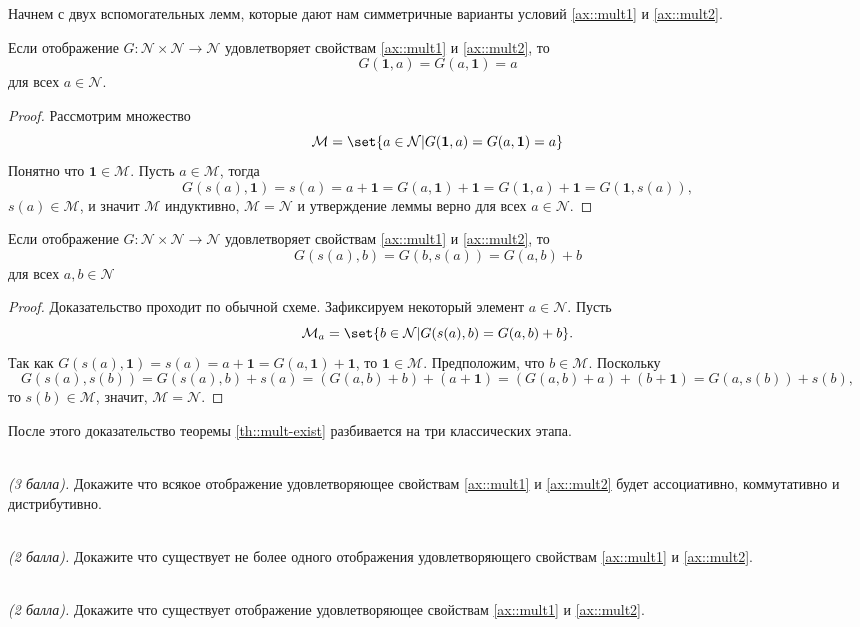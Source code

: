\documentclass{article}
\begin{document}
\noindent Начнем с двух вспомогательных лемм, которые дают нам симметричные варианты условий \eqref{ax::mult1} и \eqref{ax::mult2}.
\begin{lemma}
    Если отображение \( G: \mathcal{N} \times \mathcal{N} \rightarrow \mathcal{N} \) удовлетворяет свойствам \eqref{ax::mult1} и \eqref{ax::mult2}, то 
    \[
        G(\mathbf{1}, a) = G(a, \mathbf{1}) = a 
    \] 
    для всех \(a \in \mathcal{N}\).
\end{lemma}
\begin{proof}
    Рассмотрим множество 
    \[
        \mathcal{M} = \set{a \in \mathcal{N} | G(\mathbf{1}, a) = G(a, \mathbf{1}) = a}
    \]
    Понятно что \(\mathbf{1} \in \mathcal{M}\). Пусть \(a \in \mathcal{M}\), тогда 
    \[
        G(s(a), \mathbf{1}) = s(a) = a + \mathbf{1} = G(a, \mathbf{1}) + \mathbf{1} = G(\mathbf{1}, a) + \mathbf{1} = G(\mathbf{1}, s(a)),
    \]
    \ie \(s(a) \in \mathcal{M}\), и значит \(\mathcal{M}\) индуктивно, \ie \(\mathcal{M} = \mathcal{N}\) и утверждение леммы верно для всех \(a \in \mathcal{N}\).
\end{proof}
\begin{lemma}
    Если отображение \( G: \mathcal{N} \times \mathcal{N} \rightarrow \mathcal{N} \) удовлетворяет свойствам \eqref{ax::mult1} и \eqref{ax::mult2}, то 
    \[
        G(s(a), b) = G(b, s(a)) = G(a, b) + b
    \] 
    для всех \(a, b \in \mathcal{N}\)
\end{lemma}
\begin{proof}
    Доказательство проходит по обычной схеме. Зафиксируем некоторый элемент \(a \in \mathcal{N}\). Пусть
    \[
        \mathcal{M}_{a} = \set{ b \in \mathcal{N} | G(s(a), b) = G(a, b) + b }.
    \]        
    Так как \(G(s(a), \mathbf{1}) = s(a) = a + \mathbf{1} = G(a, \mathbf{1}) + \mathbf{1} \), то \(\mathbf{1} \in \mathcal{M} \). Предположим, что \( b \in \mathcal{M} \). Поскольку
    \[
        G(s(a), s(b)) = G(s(a), b) + s(a) = (G(a, b) + b) + (a + \mathbf{1}) = (G(a, b) + a) + (b + \mathbf{1}) = G(a, s(b)) + s(b),
    \]
    то \( s(b) \in \mathcal{M} \), значит, \( \mathcal{M} = \mathcal{N} \).
\end{proof}

\noindent После этого доказательство теоремы \ref{th::mult-exist} разбивается на три классических этапа. 
\begin{?}\ \\
    \textit{(3 балла).} Докажите что всякое отображение удовлетворяющее свойствам \eqref{ax::mult1} и \eqref{ax::mult2} будет ассоциативно, коммутативно и дистрибутивно.
\end{?}
\begin{?}\ \\
    \textit{(2 балла).} Докажите что существует не более одного отображения удовлетворяющего свойствам \eqref{ax::mult1} и \eqref{ax::mult2}.
\end{?}
\begin{?}\ \\
    \textit{(2 балла).} Докажите что существует отображение удовлетворяющее свойствам \eqref{ax::mult1} и \eqref{ax::mult2}.
\end{?}
\end{document}
